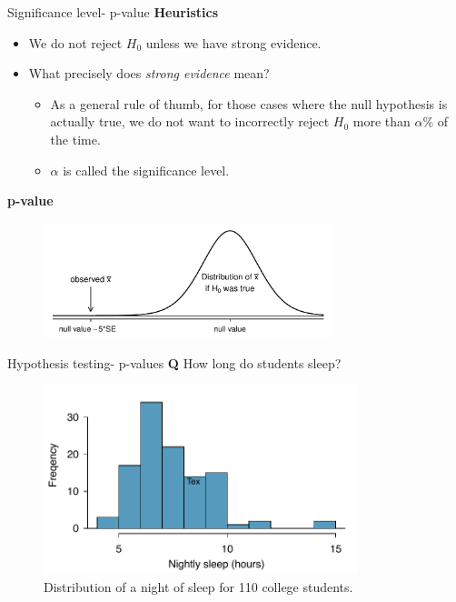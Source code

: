 \documentclass[12pt,a4paper]{beamer}
\begin{document}
\begin{frame}{Significance level- p-value}
	\textbf{Heuristics}\\
	\begin{itemize}
		\item We do not reject $H_0$ unless we have strong evidence.
		\item What precisely does \emph{strong evidence} mean? 
		 \begin{itemize}
			\item As a general rule of thumb, for those cases where the null hypothesis is actually true, we do not want to incorrectly reject $H_0$ more than $\alpha\%$ of the time.
			\item $\alpha$ is called the significance level.
		\end{itemize}
	\end{itemize}
	\textbf{p-value}
	\begin{figure}[hht]
	\centering
	\includegraphics[width=0.75\textwidth]{figures/whyWeWantPValue/whyWeWantPValue}
	\label{whyWeWantPValue}
	\end{figure}
\end{frame}
\begin{frame}{Hypothesis testing- p-values}
	\textbf{Q} How long do students sleep?
	\begin{figure}
	\centering
	\includegraphics[height=55mm]{figures/histOfSleepForCollegeThatWasCheckingForMoreThan7Hours/histOfSleepForCollegeThatWasCheckingForMoreThan7Hours}
	\caption{Distribution of a night of sleep for 110 college students. }
	\end{figure}
	
\end{frame}
\end{document}
